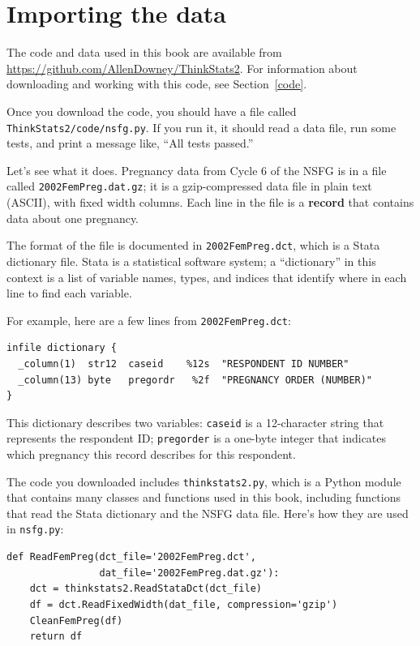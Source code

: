 \documentclass[12pt]{book}
\begin{document}
\section{Importing the data}

The code and data used in this book are available from
\url{https://github.com/AllenDowney/ThinkStats2}.  For information
about downloading and working with this code, 
see Section~\ref{code}.

Once you download the code, you should have a file called {\tt
  ThinkStats2/code/nsfg.py}.  If you run it, it should read a data
file, run some tests, and print a message like, ``All tests passed.''

Let's see what it does.  Pregnancy data from Cycle 6 of the NSFG is in
a file called {\tt 2002FemPreg.dat.gz}; it
is a gzip-compressed data file in plain text (ASCII), with fixed width
columns.  Each line in the file is a {\bf record} that
contains data about one pregnancy.

The format of the file is documented in {\tt 2002FemPreg.dct}, which
is a Stata dictionary file.  Stata is a statistical software system;
a ``dictionary'' in this context is a list of variable names, types,
and indices that identify where in each line to find each variable.

For example, here are a few lines from {\tt 2002FemPreg.dct}:
%
\begin{verbatim}
infile dictionary {
  _column(1)  str12  caseid    %12s  "RESPONDENT ID NUMBER"
  _column(13) byte   pregordr   %2f  "PREGNANCY ORDER (NUMBER)"
}
\end{verbatim}

This dictionary describes two variables: {\tt caseid} is a 12-character
string that represents the respondent ID; {\tt pregorder} is a 
one-byte integer that indicates which pregnancy this record
describes for this respondent.

The code you downloaded includes {\tt thinkstats2.py}, which is a Python
module
that contains many classes and functions used in this book,
including functions that read the Stata dictionary and
the NSFG data file.  Here's how they are used in {\tt nsfg.py}:

\begin{verbatim}
def ReadFemPreg(dct_file='2002FemPreg.dct',
                dat_file='2002FemPreg.dat.gz'):
    dct = thinkstats2.ReadStataDct(dct_file)
    df = dct.ReadFixedWidth(dat_file, compression='gzip')
    CleanFemPreg(df)
    return df
\end{verbatim}
\end{document}
